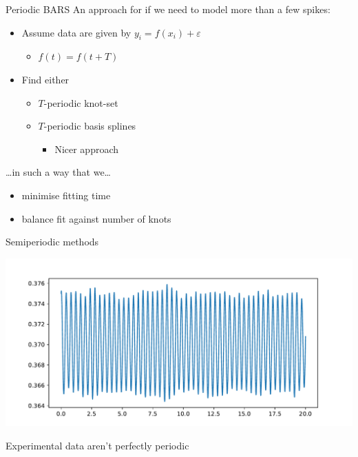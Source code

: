 \documentclass[presentation]{beamer}
\begin{document}
\begin{frame}[label={sec:orgc45aa04}]{Periodic BARS}
An approach for if we need to model more than a few spikes:   
\vfill

\begin{itemize}
\item Assume data are given by \(y_i = f(x_i) + \varepsilon\)
\begin{itemize}
\item \(f(t) = f(t+T)\)
\end{itemize}
\item Find either
\begin{itemize}
\item \(T\)-periodic knot-set
\item \(T\)-periodic basis splines
\begin{itemize}
\item Nicer approach

\vfill
\end{itemize}
\end{itemize}
\end{itemize}
\ldots{}in such a way that we\ldots{}
       \vfill
\begin{itemize}
\item minimise fitting time
\item balance fit against number of knots
\end{itemize}
\end{frame}

\begin{frame}[label={sec:orgc8bc2e2}]{Semiperiodic methods}
\begin{center}
\includegraphics[width=.9\linewidth]{./nonperiodicwind.pdf}
\end{center}
Experimental data aren't perfectly periodic
\end{frame}
\end{document}
